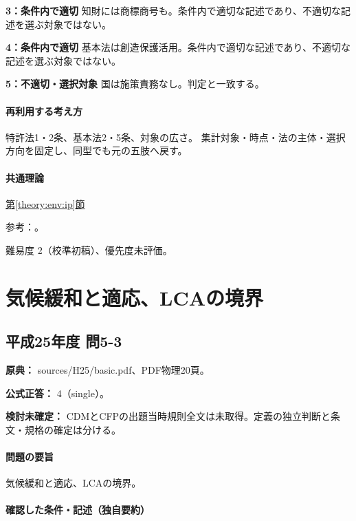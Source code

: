 \noindent\textbf{3：条件内で適切} 知財には商標商号も。条件内で適切な記述であり、不適切な記述を選ぶ対象ではない。\par

\noindent\textbf{4：条件内で適切} 基本法は創造保護活用。条件内で適切な記述であり、不適切な記述を選ぶ対象ではない。\par

\noindent\textbf{5：不適切・選択対象} 国は施策責務なし。判定と一致する。\par

\paragraph{再利用する考え方} 特許法1・2条、基本法2・5条、対象の広さ。 集計対象・時点・法の主体・選択方向を固定し、同型でも元の五肢へ戻す。

\paragraph{共通理論} \hyperref[theory:env:ip]{第\ref*{theory:env:ip}節}

\par 参考：\cite{ip_patent_statute,ip_broad_scope}。

\par 難易度 2（校準初稿）、優先度未評価。

\section{気候緩和と適応、LCAの境界}

\subsection{平成25年度 問5-3}
\label{q:h25-reg-basic-5-3}

\noindent\textbf{原典：} sources/H25/basic.pdf、PDF物理20頁。

\textbf{公式正答：} 4（single）。

\par\textbf{検討未確定：} CDMとCFPの出題当時規則全文は未取得。定義の独立判断と条文・規格の確定は分ける。

\paragraph{問題の要旨} 気候緩和と適応、LCAの境界。

\paragraph{確認した条件・記述（独自要約）}\mbox{}\par

